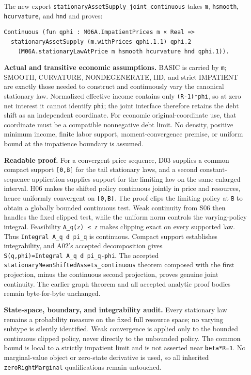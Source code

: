 \documentclass[
  11pt,
]{article}
\let\LedgerOriginalTexttt\texttt
\renewcommand{\texttt}[1]{{\small\LedgerOriginalTexttt{#1}}}
\begin{document}
The new export \texttt{stationaryAssetSupply\_joint\_continuous} takes
\texttt{m}, \texttt{hsmooth}, \texttt{hcurvature}, and \texttt{hnd} and
proves:

\begin{verbatim}
Continuous (fun qphi : M06A.ImpatientPrices m × Real =>
  stationaryAssetSupply (m.withPrices qphi.1.1) qphi.2
    (M06A.stationaryLawAtPrice m hsmooth hcurvature hnd qphi.1)).
\end{verbatim}

\textbf{Actual and transitive economic assumptions.} BASIC is carried by
\texttt{m}; SMOOTH, CURVATURE, NONDEGENERATE, IID, and strict IMPATIENT
are exactly those needed to construct and continuously vary the
canonical stationary law. Normalized effective income contains only
\texttt{(R-1)*phi}, so at zero net interest it cannot identify
\texttt{phi}; the joint interface therefore retains the debt shift as an
independent coordinate. For economic original-coordinate use, that
coordinate must be a compatible nonnegative debt limit. No density,
positive minimum income, finite labor support, moment-convergence
premise, or uniform bound at the impatience boundary is assumed.

\textbf{Readable proof.} For a convergent price sequence, D03 supplies a
common compact support \texttt{{[}0,B{]}} for the tail stationary laws,
and a second constant-sequence application supplies support for the
limiting law on the same enlarged interval. H06 makes the shifted policy
continuous jointly in price and resources, hence uniformly convergent on
\texttt{{[}0,B{]}}. The proof clips the limiting policy at \texttt{B} to
obtain a globally bounded continuous test. Weak continuity from S06 then
handles the fixed clipped test, while the uniform norm controls the
varying-policy integral. Feasibility \texttt{A\_q(z)\ ≤\ z} makes
clipping exact on every supported law. Thus
\texttt{Integral\ A\_q\ d\ pi\_q} is continuous. Compact support
establishes integrability, and A02's accepted decomposition gives
\texttt{S(q,phi)=Integral\ A\_q\ d\ pi\_q-phi}. The accepted
\texttt{stationaryMeanShiftedAssets\_continuous} theorem composed with
the first projection, minus the continuous second projection, proves
genuine joint continuity. The earlier graph theorem and all accepted
analytic proof bodies remain byte-for-byte unchanged.

\textbf{State-space, boundary, and integrability audit.} Every
stationary law remains a probability measure on the fixed full resource
space; no varying subtype is silently identified. Weak convergence is
applied only to the bounded continuous clipped policy, never directly to
the unbounded policy. The common bound is local to a strictly impatient
limit and is not asserted near \texttt{beta*R=1}. No marginal-value
object or zero-state derivative is used, so all inherited
\texttt{zeroRightMarginal} qualifications remain untouched.
\end{document}
